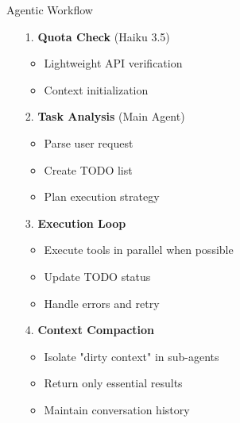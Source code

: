 \documentclass[aspectratio=169]{beamer}
\begin{document}
\begin{frame}{Agentic Workflow}
	\begin{itemize}
		\item[1.] {\color{highlight}\textbf{Quota Check}} (Haiku 3.5)
		\begin{itemize}
			\item Lightweight API verification
			\item Context initialization
		\end{itemize}
		
		\item[2.] {\color{highlight}\textbf{Task Analysis}} (Main Agent)
		\begin{itemize}
			\item Parse user request
			\item Create TODO list
			\item Plan execution strategy
		\end{itemize}
		
		\item[3.] {\color{highlight}\textbf{Execution Loop}}
		\begin{itemize}
			\item Execute tools in parallel when possible
			\item Update TODO status
			\item Handle errors and retry
		\end{itemize}
		
		\item[4.] {\color{highlight}\textbf{Context Compaction}}
		\begin{itemize}
			\item Isolate "dirty context" in sub-agents
			\item Return only essential results
			\item Maintain conversation history
		\end{itemize}
	\end{itemize}
\end{frame}
\end{document}
